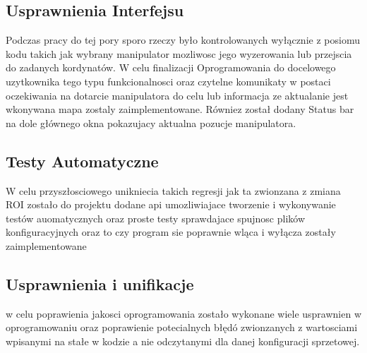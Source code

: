 \documentclass[11pt,a4paper]{article}
\begin{document}
    \subsection{Usprawnienia Interfejsu}
    \hspace{1cm} Podczas pracy do tej pory sporo rzeczy było kontrolowanych wyłącznie z posiomu kodu takich jak wybrany manipulator mozliwosc jego wyzerowania lub przejscia do zadanych kordynatów. W celu finalizacji Oprogramowania do docelowego uzytkownika tego typu funkcionalnosci oraz czytelne komunikaty w postaci oczekiwania na dotarcie manipulatora do celu lub informacja ze aktualanie jest wkonywana mapa zostaly zaimplementowane. Równiez został dodany Status bar na dole głównego okna pokazujacy aktualna pozucje manipulatora.

    \subsection{Testy Automatyczne}
    \hspace{1cm} W celu przyszłosciowego unikniecia takich regresji jak ta zwionzana z zmiana ROI zostało do projektu dodane api umozliwiajace tworzenie i wykonywanie testów auomatycznych oraz proste testy sprawdajace spujnosc plików konfiguracyjnych oraz to czy program sie poprawnie wląca i wyłącza zostały zaimplementowane

    \subsection{Usprawnienia i unifikacje}
    \hspace{1cm} w celu poprawienia jakosci oprogramowania zostało wykonane wiele usprawnien w oprogramowaniu oraz poprawienie potecialnych błędó zwionzanych z wartosciami wpisanymi na stałe w kodzie a nie odczytanymi dla danej konfiguracji sprzetowej.
\end{document}
